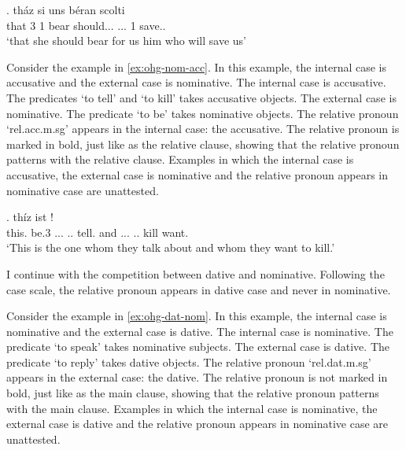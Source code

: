 \exg. tház si uns béran scolti   \\
 that 3 1 bear\scsub{[acc]} should... ... 1 save..\scsub{[nom]}\\
 `that she should bear for us him who will save us' \label{ex:ohg-counterexample}


Consider the example in \ref{ex:ohg-nom-acc}. In this example, the internal case is accusative and the external case is nominative.
The internal case is accusative. The predicates  `to tell' and  `to kill' takes accusative objects.
The external case is nominative. The predicate  `to be' takes nominative objects.
The relative pronoun  `\ac{rel}.\ac{acc}.\ac{m}.\ac{sg}' appears in the internal case: the accusative. The relative pronoun is marked in bold, just like as the relative clause, showing that the relative pronoun patterns with the relative clause.
Examples in which the internal case is accusative, the external case is nominative and the relative pronoun appears in nominative case are unattested.

\exg. thíz ist        !\\
this. be.3\scsub{[nom]} ... .. tell.\scsub{[acc]}
and ... .. kill\scsub{[acc]} want.\\
`This is the one whom they talk about and whom they want to kill.' \label{ex:ohg-nom-acc}

I continue with the competition between dative and nominative. Following the case scale, the relative pronoun appears in dative case and never in nominative.

Consider the example in \ref{ex:ohg-dat-nom}. In this example, the internal case is nominative and the external case is dative.
The internal case is nominative. The predicate  `to speak' takes nominative subjects.
The external case is dative. The predicate  `to reply' takes dative objects.
The relative pronoun  `\ac{rel}.\ac{dat}.\ac{m}.\ac{sg}' appears in the external case: the dative. The relative pronoun is not marked in bold, just like as the main clause, showing that the relative pronoun patterns with the main clause.
Examples in which the internal case is nominative, the external case is dative and the relative pronoun appears in nominative case are unattested.

